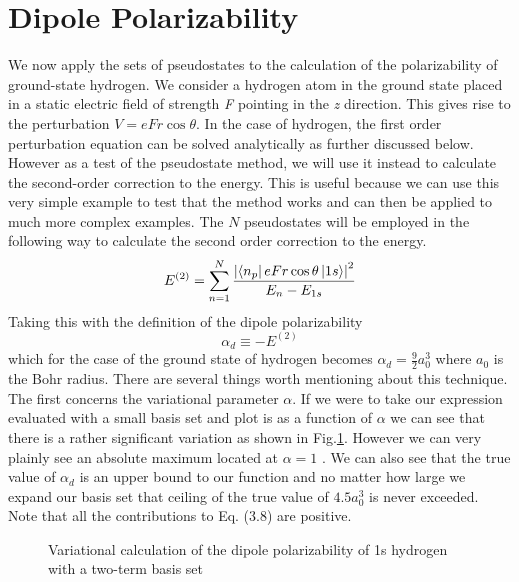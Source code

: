 \section{Dipole Polarizability}
We now apply the sets of pseudostates to the calculation of the polarizability of ground-state hydrogen. We consider a hydrogen atom in the ground state placed in a static electric field of strength \textit{F} pointing in the \textit{z} direction. This gives rise to the perturbation \(V=eFr\cos{\theta}\). In the case of hydrogen, the first order perturbation equation can be solved analytically as further discussed below. However as a test of the pseudostate method, we will use it instead to calculate the second-order correction to the energy. This is useful because we can use this very simple example to test that the method works and can then be applied to much more complex examples. The $N$ pseudostates will be employed in the following way to calculate the second order correction to the energy.
\begin{equation}
    E^{(2)}=\sum_{n=1}^{N}\frac{\abs{\bra{n_{p}}eFr\cos{\theta}\ket{1s}}^{2}}{E_{n}-E_{1s}}
\end{equation}
Taking this with the definition of the dipole polarizability
\begin{equation}
    \alpha_{d}\equiv- E^{(2)}
\end{equation}
which for the case of the ground state of hydrogen becomes $\alpha_d=\frac{9}{2}a_{0}^{3}$ where $a_0$ is the Bohr radius. There are several things worth mentioning about this technique. The first concerns the variational parameter \(\alpha\). If we were to take our expression evaluated with a small basis set and plot is as a function of \(\alpha\) we can see that there is a rather significant variation as shown in Fig.\ref{fig:Dipole Polarizability}. However we can very plainly see an absolute maximum located at \(\alpha=1\) \cite{variational}.  We can also see that the true value of $\alpha_d$ is an upper bound to our function and no matter how large we expand our basis set that ceiling of the true value of \(4.5a_{0}^{3}\) is never exceeded. Note that all the contributions to Eq. (3.8) are positive.
\begin{figure}
    \centering
    \caption{Variational calculation of the dipole polarizability of 1s hydrogen with a two-term basis set}
    \label{fig:Dipole Polarizability}
\end{figure}

